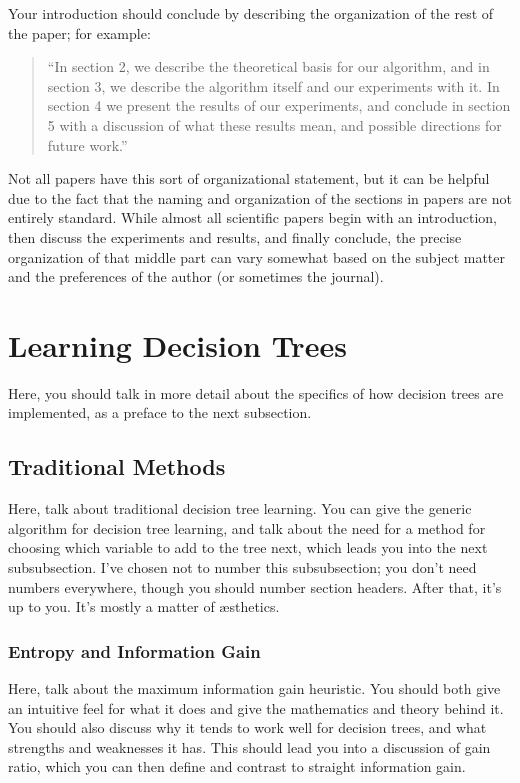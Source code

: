 \documentclass[12pt, letterpaper]{article}
\begin{document}
Your introduction should conclude by describing the organization of the rest of
the paper; for example:
\begin{quote}
``In section 2, we describe the theoretical basis for our algorithm, and in section
3, we describe the algorithm itself and our experiments with it.  In section 4
we present the results of our experiments, and conclude in section 5 with a
discussion of what these results mean, and possible directions for future
work.''
\end{quote}

Not all papers have this sort of organizational statement, but it can be helpful
due to the fact that the naming and organization of the sections in papers are
not entirely standard.  While almost all scientific papers begin with an
introduction, then discuss the experiments and results, and finally conclude,
the precise organization of that middle part can vary somewhat based on the
subject matter and the preferences of the author (or sometimes the journal).

\section{Learning Decision Trees}
Here, you should talk in more detail about the specifics of how decision trees
are implemented, as a preface to the next subsection.

\subsection{Traditional Methods}
Here, talk about traditional decision tree learning.  You can give the generic
algorithm for decision tree learning, and talk about the need for a method for
choosing which variable to add to the tree next, which leads you into the next
subsubsection.  I've chosen not to number this subsubsection; you don't need
numbers everywhere, though you should number section headers.  After that, it's
up to you.  It's mostly a matter of \ae sthetics.

\subsubsection*{Entropy and Information Gain}
Here, talk about the maximum information gain heuristic.  You should both give
an intuitive feel for what it does and give the mathematics and theory behind
it.  You should also discuss why it tends to work well for decision trees, and
what strengths and weaknesses it has.  This should lead you into a discussion of
gain ratio, which you can then define and contrast to straight information gain.
\end{document}
